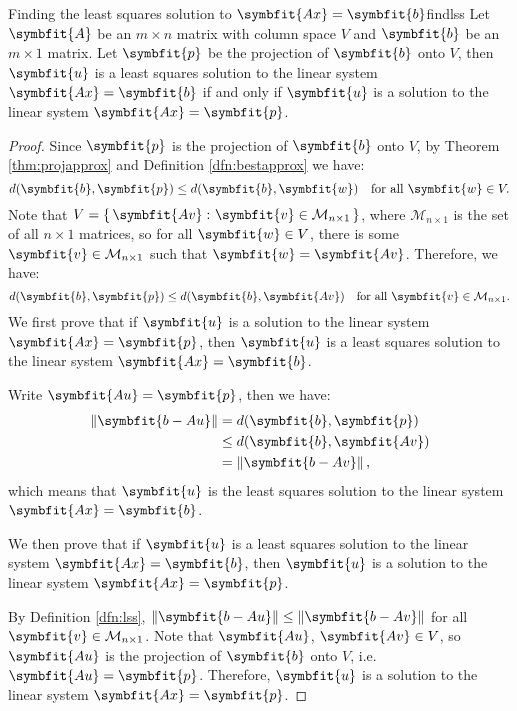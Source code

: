 \documentclass[math]{amznotes}
\theoremstyle{remark}
\begin{document}
\begin{thmbox}{Finding the least squares solution to $\symbfit{Ax} = \symbfit{b}$}{findlss}
    Let $\symbfit{A}$ be an $m \times n$ matrix with column space $V$ and $\symbfit{b}$ be an $m \times 1$ matrix. Let $\symbfit{p}$ be the projection of $\symbfit{b}$ onto $V$, then $\symbfit{u}$ is a least squares solution to the linear system $\symbfit{Ax} = \symbfit{b}$ if and only if $\symbfit{u}$ is a solution to the linear system $\symbfit{Ax} = \symbfit{p}$.
    \tcblower
    \begin{proof}
        Since $\symbfit{p}$ is the projection of $\symbfit{b}$ onto $V$, by Theorem \ref{thm:projapprox} and Definition \ref{dfn:bestapprox} we have:
        \begin{displaymath}
            d(\symbfit{b}, \symbfit{p}) \leq d(\symbfit{b}, \symbfit{w}) \quad \textrm{for all } \symbfit{w} \in V.
        \end{displaymath}
        Note that $V = \left\{ \, \symbfit{Av} \,\colon \symbfit{v} \in \mathcal{M}_{n \times 1} \, \right\}$, where $\mathcal{M}_{n \times 1}$ is the set of all $n \times 1$ matrices, so for all $\symbfit{w} \in V$, there is some $\symbfit{v} \in \mathcal{M}_{n \times 1}$ such that $\symbfit{w} = \symbfit{Av}$. Therefore, we have:
        \begin{displaymath}
            d(\symbfit{b}, \symbfit{p}) \leq d(\symbfit{b}, \symbfit{Av}) \quad \textrm{for all } \symbfit{v} \in \mathcal{M}_{n \times 1}.
        \end{displaymath}
        We first prove that if $\symbfit{u}$ is a solution to the linear system $\symbfit{Ax} = \symbfit{p}$, then $\symbfit{u}$ is a least squares solution to the linear system $\symbfit{Ax} = \symbfit{b}$.

        Write $\symbfit{Au} = \symbfit{p}$, then we have:
        \begin{align*}
            \left\lVert \symbfit{b - Au} \right\rVert & = d(\symbfit{b}, \symbfit{p})                \\
                                                      & \leq d(\symbfit{b}, \symbfit{Av})            \\
                                                      & = \left\lVert \symbfit{b - Av} \right\rVert,
        \end{align*}
        which means that $\symbfit{u}$ is the least squares solution to the linear system $\symbfit{Ax} = \symbfit{b}$.

        We then prove that if $\symbfit{u}$ is a least squares solution to the linear system $\symbfit{Ax} = \symbfit{b}$, then $\symbfit{u}$ is a solution to the linear system $\symbfit{Ax} = \symbfit{p}$.

        By Definition \ref{dfn:lss}, $\left\lVert \symbfit{b - Au} \right\rVert \leq \left\lVert \symbfit{b - Av} \right\rVert$ for all $\symbfit{v} \in \mathcal{M}_{n \times 1}$. Note that $\symbfit{Au}$, $\symbfit{Av} \in V$, so $\symbfit{Au}$ is the projection of $\symbfit{b}$ onto $V$, i.e. $\symbfit{Au} = \symbfit{p}$. Therefore, $\symbfit{u}$ is a solution to the linear system $\symbfit{Ax} = \symbfit{p}$.
    \end{proof}
\end{thmbox}
\end{document}
